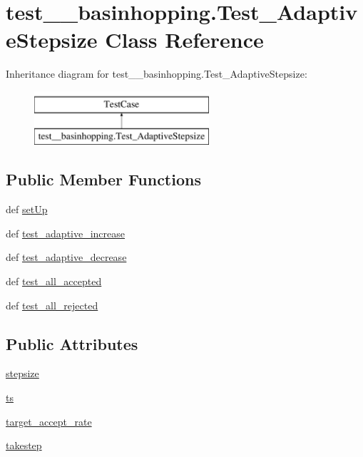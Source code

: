\hypertarget{classtest____basinhopping_1_1Test__AdaptiveStepsize}{}\section{test\+\_\+\+\_\+basinhopping.\+Test\+\_\+\+Adaptive\+Stepsize Class Reference}
\label{classtest____basinhopping_1_1Test__AdaptiveStepsize}
Inheritance diagram for test\+\_\+\+\_\+basinhopping.\+Test\+\_\+\+Adaptive\+Stepsize\+:\begin{figure}[H]
\begin{center}
\leavevmode
\includegraphics[height=2.000000cm]{classtest____basinhopping_1_1Test__AdaptiveStepsize}
\end{center}
\end{figure}
\subsection*{Public Member Functions}
\begin{DoxyCompactItemize}
\item 
def \hyperlink{classtest____basinhopping_1_1Test__AdaptiveStepsize_abc26265afc5ac059474846e3ebb2bd0b}{set\+Up}
\item 
def \hyperlink{classtest____basinhopping_1_1Test__AdaptiveStepsize_a33585d57d57d5583ebaa36f66155a1ef}{test\+\_\+adaptive\+\_\+increase}
\item 
def \hyperlink{classtest____basinhopping_1_1Test__AdaptiveStepsize_ac437407770223b5eb75d23e2aabfe9ae}{test\+\_\+adaptive\+\_\+decrease}
\item 
def \hyperlink{classtest____basinhopping_1_1Test__AdaptiveStepsize_af1da110d5a986a5f1687fb3ae82c7ee3}{test\+\_\+all\+\_\+accepted}
\item 
def \hyperlink{classtest____basinhopping_1_1Test__AdaptiveStepsize_a9f313bb6a8fe7f7b2bfed6f97abf0fff}{test\+\_\+all\+\_\+rejected}
\end{DoxyCompactItemize}
\subsection*{Public Attributes}
\begin{DoxyCompactItemize}
\item 
\hyperlink{classtest____basinhopping_1_1Test__AdaptiveStepsize_acb1e0676add447fa0a42ed206c5147e5}{stepsize}
\item 
\hyperlink{classtest____basinhopping_1_1Test__AdaptiveStepsize_a107dbcfa1d8b1400e4fbc8dbd631cbe5}{ts}
\item 
\hyperlink{classtest____basinhopping_1_1Test__AdaptiveStepsize_a7fb50bede735dac3a3c239bc367af376}{target\+\_\+accept\+\_\+rate}
\item 
\hyperlink{classtest____basinhopping_1_1Test__AdaptiveStepsize_a0ef1b1f793cad5ae82a8310437f48608}{takestep}
\end{DoxyCompactItemize}


